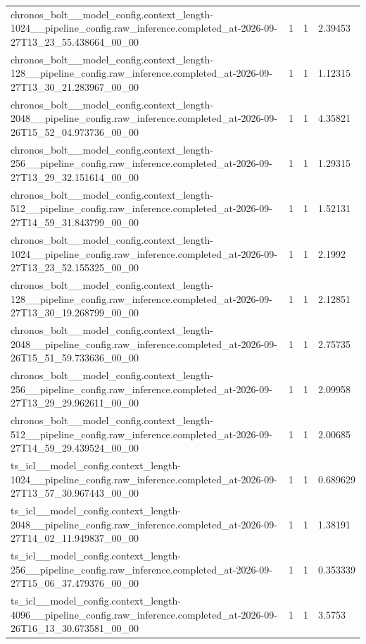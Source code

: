 \begin{tabular}{llll}
chronos\_bolt\_\_model\_config.context\_length-1024\_\_pipeline\_config.raw\_inference.completed\_at-2026-09-27T13\_23\_55.438664\_00\_00 & 1 & 1 & 2.39453 \\
chronos\_bolt\_\_model\_config.context\_length-128\_\_pipeline\_config.raw\_inference.completed\_at-2026-09-27T13\_30\_21.283967\_00\_00 & 1 & 1 & 1.12315 \\
chronos\_bolt\_\_model\_config.context\_length-2048\_\_pipeline\_config.raw\_inference.completed\_at-2026-09-26T15\_52\_04.973736\_00\_00 & 1 & 1 & 4.35821 \\
chronos\_bolt\_\_model\_config.context\_length-256\_\_pipeline\_config.raw\_inference.completed\_at-2026-09-27T13\_29\_32.151614\_00\_00 & 1 & 1 & 1.29315 \\
chronos\_bolt\_\_model\_config.context\_length-512\_\_pipeline\_config.raw\_inference.completed\_at-2026-09-27T14\_59\_31.843799\_00\_00 & 1 & 1 & 1.52131 \\
chronos\_bolt\_\_model\_config.context\_length-1024\_\_pipeline\_config.raw\_inference.completed\_at-2026-09-27T13\_23\_52.155325\_00\_00 & 1 & 1 & 2.1992 \\
chronos\_bolt\_\_model\_config.context\_length-128\_\_pipeline\_config.raw\_inference.completed\_at-2026-09-27T13\_30\_19.268799\_00\_00 & 1 & 1 & 2.12851 \\
chronos\_bolt\_\_model\_config.context\_length-2048\_\_pipeline\_config.raw\_inference.completed\_at-2026-09-26T15\_51\_59.733636\_00\_00 & 1 & 1 & 2.75735 \\
chronos\_bolt\_\_model\_config.context\_length-256\_\_pipeline\_config.raw\_inference.completed\_at-2026-09-27T13\_29\_29.962611\_00\_00 & 1 & 1 & 2.09958 \\
chronos\_bolt\_\_model\_config.context\_length-512\_\_pipeline\_config.raw\_inference.completed\_at-2026-09-27T14\_59\_29.439524\_00\_00 & 1 & 1 & 2.00685 \\
ts\_icl\_\_model\_config.context\_length-1024\_\_pipeline\_config.raw\_inference.completed\_at-2026-09-27T13\_57\_30.967443\_00\_00 & 1 & 1 & 0.689629 \\
ts\_icl\_\_model\_config.context\_length-2048\_\_pipeline\_config.raw\_inference.completed\_at-2026-09-27T14\_02\_11.949837\_00\_00 & 1 & 1 & 1.38191 \\
ts\_icl\_\_model\_config.context\_length-256\_\_pipeline\_config.raw\_inference.completed\_at-2026-09-27T15\_06\_37.479376\_00\_00 & 1 & 1 & 0.353339 \\
ts\_icl\_\_model\_config.context\_length-4096\_\_pipeline\_config.raw\_inference.completed\_at-2026-09-26T16\_13\_30.673581\_00\_00 & 1 & 1 & 3.5753 \\

\end{tabular}
